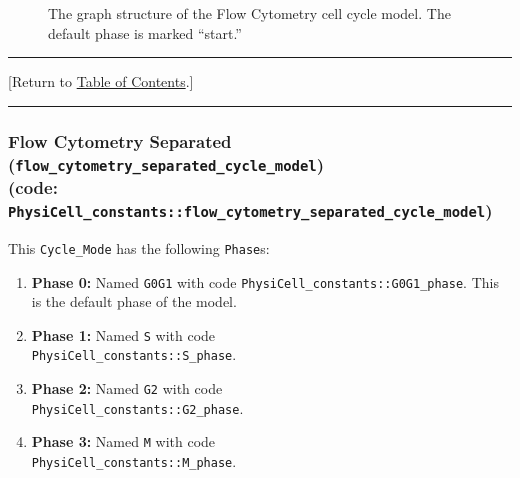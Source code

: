 \documentclass[12pt]{article}
\renewcommand{\v}{\verb}
\newcommand{\TOClink}{\begin{center}\hrule\vskip-5pt\phantom{.}\hfill[Return to \hyperlink{TOC}{Table of Contents}.]\hfill\phantom{.}\vskip3pt\hrule\end{center}}
\begin{document}
\begin{figure}
\begin{mdframed}[style=mystyle]
\caption{The graph structure of the Flow Cytometry cell cycle model. The default phase is marked 
``start.''}
\label{fig:cycle_model:flow_cytometry}
\end{mdframed}
\end{figure}

\TOClink 


\subsubsection{Flow Cytometry Separated (\texttt{flow\_cytometry\_separated\_cycle\_model})\\
(code: \texttt{PhysiCell\_constants::flow\_cytometry\_separated\_cycle\_model})}
\label{sec:Standard_Models:Flow_Cytometry_Separated}
This \v|Cycle_Mode| has the following \v|Phase|s: 
\begin{enumerate}
\item 
\textbf{Phase 0:} Named \v|G0G1| with code \v|PhysiCell_constants::G0G1_phase|. This is the default 
phase of the model. 

\item 
\textbf{Phase 1:} Named \v|S| with code \\ \v|PhysiCell_constants::S_phase|. 

\item 
\textbf{Phase 2:} Named \v|G2| with code \\ \v|PhysiCell_constants::G2_phase|. 

\item 
\textbf{Phase 3:} Named \v|M| with code \\ \v|PhysiCell_constants::M_phase|. 

\end{enumerate}
\end{document}
